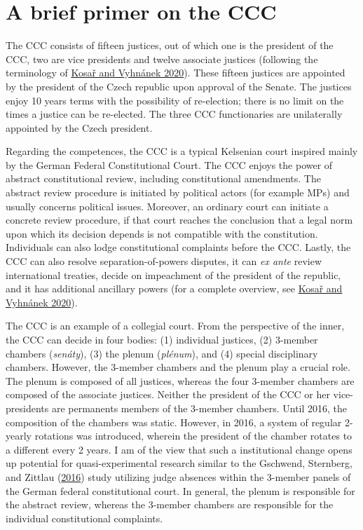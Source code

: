 \documentclass[
  11pt,
]{article}
\begin{document}
\hypertarget{a-brief-primer-on-the-ccc}{%
\section{A brief primer on the CCC}\label{a-brief-primer-on-the-ccc}}

The CCC consists of fifteen justices, out of which one is the president
of the CCC, two are vice presidents and twelve associate justices
(following the terminology of
\protect\hyperlink{ref-kosarConstitutionalCourtCzechia2020}{Kosař and
Vyhnánek 2020}). These fifteen justices are appointed by the president
of the Czech republic upon approval of the Senate. The justices enjoy 10
years terms with the possibility of re-election; there is no limit on
the times a justice can be re-elected. The three CCC functionaries are
unilaterally appointed by the Czech president.

Regarding the competences, the CCC is a typical Kelsenian court inspired
mainly by the German Federal Constitutional Court. The CCC enjoys the
power of abstract constitutional review, including constitutional
amendments. The abstract review procedure is initiated by political
actors (for example MPs) and usually concerns political issues.
Moreover, an ordinary court can initiate a concrete review procedure, if
that court reaches the conclusion that a legal norm upon which its
decision depends is not compatible with the constitution. Individuals
can also lodge constitutional complaints before the CCC. Lastly, the CCC
can also resolve separation-of-powers disputes, it can \emph{ex ante}
review international treaties, decide on impeachment of the president of
the republic, and it has additional ancillary powers (for a complete
overview, see
\protect\hyperlink{ref-kosarConstitutionalCourtCzechia2020}{Kosař and
Vyhnánek 2020}).

The CCC is an example of a collegial court. From the perspective of the
inner, the CCC can decide in four bodies: (1) individual justices, (2)
3-member chambers (\emph{senáty}), (3) the plenum (\emph{plénum}), and
(4) special disciplinary chambers. However, the 3-member chambers and
the plenum play a crucial role. The plenum is composed of all justices,
whereas the four 3-member chambers are composed of the associate
justices. Neither the president of the CCC or her vice-presidents are
permanents members of the 3-member chambers. Until 2016, the composition
of the chambers was static. However, in 2016, a system of regular
2-yearly rotations was introduced, wherein the president of the chamber
rotates to a different every 2 years. I am of the view that such a
institutional change opens up potential for quasi-experimental research
similar to the Gschwend, Sternberg, and Zittlau
(\protect\hyperlink{ref-gschwendAreJudgesPolitical2016}{2016}) study
utilizing judge absences within the 3-member panels of the German
federal constitutional court. In general, the plenum is responsible for
the abstract review, whereas the 3-member chambers are responsible for
the individual constitutional complaints.
\end{document}
